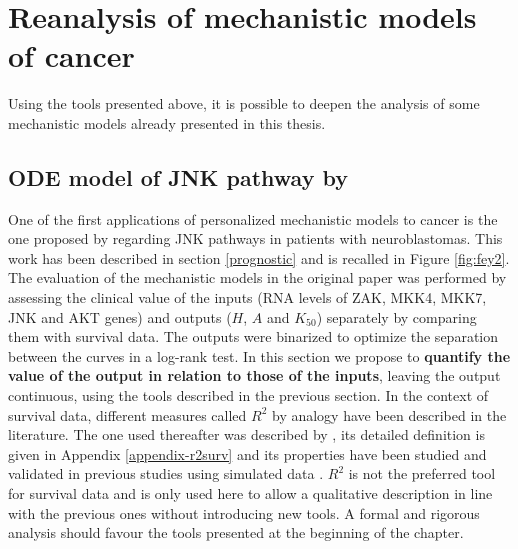 \documentclass[a4paper,12pt,twoside,onecolumn,openright,final,oldfontcommands]{memoir}
\begin{document}
\section{Reanalysis of mechanistic models of cancer}\label{reanalysis}

Using the tools presented above, it is possible to deepen the analysis
of some mechanistic models already presented in this thesis.

\subsection{\texorpdfstring{ODE model of JNK pathway by
\citet{fey2015signaling}}{ODE model of JNK pathway by @fey2015signaling}}\label{ode-model-of-jnk-pathway-by-fey2015signaling}

One of the first applications of personalized mechanistic models to
cancer is the one proposed by \citet{fey2015signaling} regarding JNK
pathways in patients with neuroblastomas. This work has been described
in section \ref{prognostic} and is recalled in Figure \ref{fig:fey2}.
The evaluation of the mechanistic models in the original paper was
performed by assessing the clinical value of the inputs (RNA levels of
ZAK, MKK4, MKK7, JNK and AKT genes) and outputs (\(H\), \(A\) and
\(K_{50}\)) separately by comparing them with survival data. The outputs
were binarized to optimize the separation between the curves in a
log-rank test. In this section we propose to \textbf{quantify the value
of the output in relation to those of the inputs}, leaving the output
continuous, using the tools described in the previous section. In the
context of survival data, different measures called \(R^2\) by analogy
have been described in the literature. The one used thereafter was
described by \citet{royston2004new}, its detailed definition is given in
Appendix \ref{appendix-r2surv} and its properties have been studied and
validated in previous studies using simulated data
\citep{choodari2012simulation}. \(R^2\) is not the preferred tool for
survival data and is only used here to allow a qualitative description
in line with the previous ones without introducing new tools. A formal
and rigorous analysis should favour the tools presented at the beginning
of the chapter.
\end{document}
